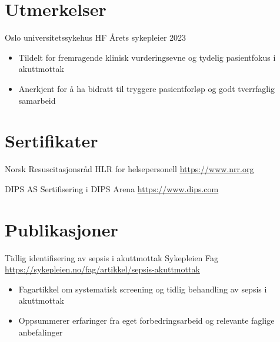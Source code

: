 \documentclass[a4paper, serif, 10pt]{moderncv}
\begin{document}
\section{Utmerkelser}

        {Oslo universitetssykehus HF}
        {Årets sykepleier 2023}
        {}
        {}
        {\begin{itemize}
\item Tildelt for fremragende klinisk vurderingsevne og tydelig pasientfokus i akuttmottak
\item Anerkjent for å ha bidratt til tryggere pasientforløp og godt tverrfaglig samarbeid
\end{itemize}}
\section{Sertifikater}

        {Norsk Resuscitasjonsråd}
        {HLR for helsepersonell}
        {\url{https://www.nrr.org}}
        {}
        {}

        {DIPS AS}
        {Sertifisering i DIPS Arena}
        {\url{https://www.dips.com}}
        {}
        {}
\section{Publikasjoner}

        {Tidlig identifisering av sepsis i akuttmottak}
        {Sykepleien Fag}
        {\url{https://sykepleien.no/fag/artikkel/sepsis-akuttmottak}}
        {}
        {\begin{itemize}
\item Fagartikkel om systematisk screening og tidlig behandling av sepsis i akuttmottak
\item Oppsummerer erfaringer fra eget forbedringsarbeid og relevante faglige anbefalinger
\end{itemize}}
\end{document}

